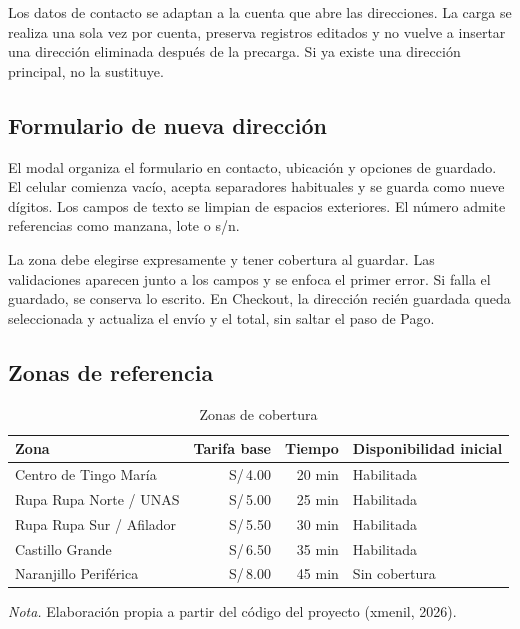 \documentclass[12pt,letterpaper]{article}
\newcommand{\soles}[1]{S/\,#1}
\begin{document}
Los datos de contacto se adaptan a la cuenta que abre las direcciones. La carga se realiza una sola vez por cuenta, preserva registros editados y no vuelve a insertar una dirección eliminada después de la precarga. Si ya existe una dirección principal, no la sustituye.

\subsection{Formulario de nueva dirección}

El modal organiza el formulario en contacto, ubicación y opciones de guardado. El celular comienza vacío, acepta separadores habituales y se guarda como nueve dígitos. Los campos de texto se limpian de espacios exteriores. El número admite referencias como manzana, lote o s/n.

La zona debe elegirse expresamente y tener cobertura al guardar. Las validaciones aparecen junto a los campos y se enfoca el primer error. Si falla el guardado, se conserva lo escrito. En Checkout, la dirección recién guardada queda seleccionada y actualiza el envío y el total, sin saltar el paso de Pago.

\subsection{Zonas de referencia}

\begin{table}[htbp]
\caption{Zonas de cobertura}
\begin{singlespace}
\begin{tabularx}{\textwidth}{XrrL{2.3cm}}
\toprule
Zona & Tarifa base & Tiempo & Disponibilidad inicial \\
\midrule
Centro de Tingo María & \soles{4.00} & 20 min & Habilitada \\
Rupa Rupa Norte / UNAS & \soles{5.00} & 25 min & Habilitada \\
Rupa Rupa Sur / Afilador & \soles{5.50} & 30 min & Habilitada \\
Castillo Grande & \soles{6.50} & 35 min & Habilitada \\
Naranjillo Periférica & \soles{8.00} & 45 min & Sin cobertura \\
\bottomrule
\end{tabularx}
\end{singlespace}
\noindent\textit{Nota.} Elaboración propia a partir del código del proyecto (xmenil, 2026).
\end{table}
\end{document}
